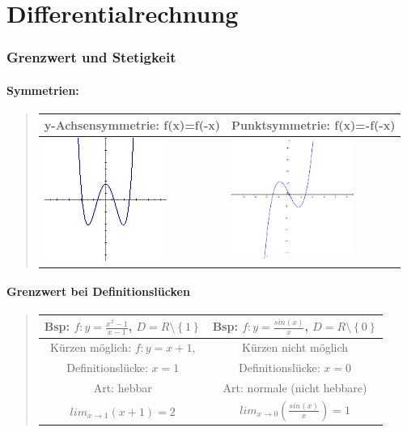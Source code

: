 
\part*{{\huge{Differentialrechnung}}}


\section*{{\large{Grenzwert und Stetigkeit}}}


\subsection*{Symmetrien:}
\begin{quote}
\begin{tabular}{|l||l|}
\hline 
y-Achsensymmetrie: f(x)=f(-x) & Punktsymmetrie: f(x)=-f(-x)\tabularnewline
\hline 
\includegraphics[width=4cm]{Differentialrechnung/achsensymm1} & \includegraphics[width=4cm]{Differentialrechnung/Punktsym.jpg}\tabularnewline
\hline 
\end{tabular}
\end{quote}

\subsection*{Grenzwert bei Definitionslücken}
\begin{quote}
\begin{tabular}{|c|c|}
\hline 
Bsp: $f:y=\frac{x^{2}-1}{x-1}$, $D=R\setminus\left\{ 1\right\} $ & Bsp: $f:y=\frac{sin(x)}{x}$, $D=R\setminus\left\{ 0\right\} $\tabularnewline
\hline 
Kürzen möglich: $f:y=x+1$, & Kürzen nicht möglich\tabularnewline
\hline 
Definitionslücke: $x=1$ & Definitionslücke: $x=0$\tabularnewline
\hline 
Art: hebbar & Art: normale (nicht hebbare)\tabularnewline
\hline 
$lim_{x\rightarrow1}(x+1)=2$ & $lim_{x\rightarrow0}(\frac{sin(x)}{x})=1$\tabularnewline
\hline 
\end{tabular}
\end{quote}

